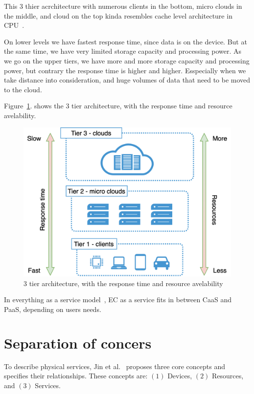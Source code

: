 This 3 thier acrchitecture with numerous clients in the bottom, micro clouds in the middle, and cloud on the top kinda resembles cache level architecture in CPU~\cite{FarshinRMK19}. 

On lower levels we have fastest response time, since data is on the device. But at the same time, we have very limited storage capacity and processing power. As we go on the upper tiers, we have more and more storage capacity and processing power, but contrary the response time is higher and higher.  Esspecially when we take distance into consideration, and huge volumes of data that need to be moved to the cloud.

Figure~\ref{fig:fig9}. shows the 3 tier architecture, with the response time and resource avelability.

\begin{figure}[H]
	\includegraphics[width=\linewidth]{images/Figure9}
	\vspace{-0.7cm}
	\caption{3 tier architecture, with the response time and resource avelability}
	\label{fig:fig9}
\end{figure}

In everything as a service model~\cite{DuanFZSNH15}, EC as a service fits in between CaaS and PaaS, depending on users needs. 
%
%
\section{Separation of concers}\label{sec:separation_of_concerns}
%
To describe physical services, Jin et al.~\cite{JinCJL14} proposes three core concepts and specifies their relationships. These concepts are: $(1)$ Devices, $(2)$ Resources, and $(3)$ Services. 

